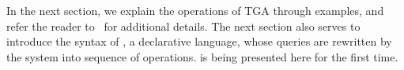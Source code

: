 In the next section, we explain the operations of TGA through
examples, and refer the reader to~\cite{PortalarXiv2016} for
additional details.  The next section also serves to introduce the
syntax of \ql, a declarative language, whose queries are rewritten by
the \sys system into sequence of \tga operations.  \ql is being
presented here for the first time.
